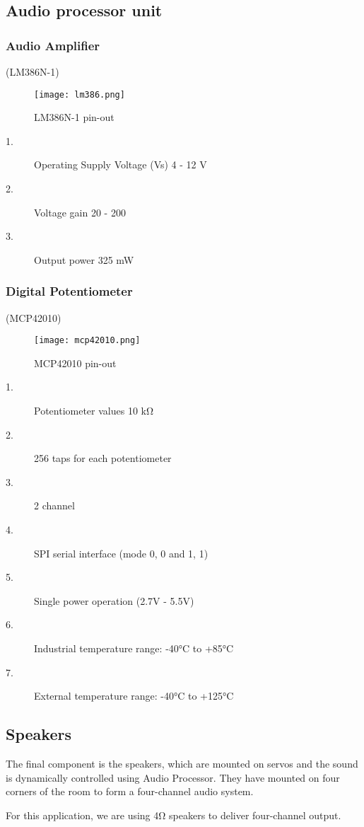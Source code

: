 \documentclass[../../../patent_v1.tex]{subfiles}
\begin{document}
\subsection{Audio processor unit}

\subsubsection{Audio Amplifier}

(LM386N-1)

\begin{figure}[ht]
    \centering
    \texttt{[image: lm386.png]}
    \caption{LM386N-1 pin-out}
\end{figure}

\FloatBarrier

\begin{description}
    \item[1.]Operating Supply Voltage (Vs) 4 - 12 V
    \item[2.]Voltage gain 20 - 200
    \item[3.]Output power 325 mW
\end{description}

\subsubsection{Digital Potentiometer}

(MCP42010)

\begin{figure}[ht]
    \centering
    \texttt{[image: mcp42010.png]}
    \caption{MCP42010 pin-out}
\end{figure}

\FloatBarrier

\begin{description}
    \item[1.]Potentiometer values 10 k\si{\ohm}
    \item[2.]256 taps for each potentiometer
    \item[3.]2 channel
    \item[4.]SPI serial interface (mode 0, 0 and 1, 1)
    \item[5.]Single power operation (2.7V - 5.5V)
    \item[6.]Industrial temperature range: -40\si{\celsius} to +85\si{\celsius} 
    \item[7.]External temperature range: -40\si{\celsius} to +125\si{\celsius}    
\end{description}
 
\subsection{Speakers}

The final component is the speakers, which are mounted on servos and the sound is 
dynamically controlled using Audio Processor. They have mounted on four corners of the 
room to form a four-channel audio system. 

For this application, we are using 4\si{\ohm} speakers to deliver four-channel output.
\end{document}

